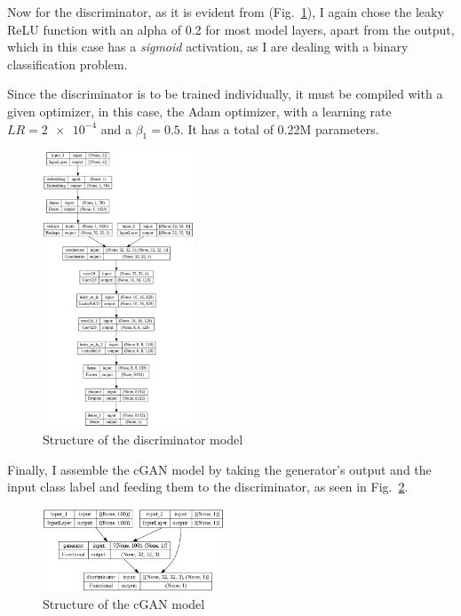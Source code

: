 \documentclass[conference]{IEEEtran}
\begin{document}
Now for the discriminator, as it is evident from (Fig.~\ref{fig:DiscStruct}), I again chose the leaky ReLU function with an alpha of 0.2 for most model layers, apart from the output, which in this case has a \textit{sigmoid} activation, as I are dealing with a binary classification problem.

Since the discriminator is to be trained individually, it must be compiled with a given optimizer, in this case, the Adam optimizer, with a learning rate $LR=\num{2e-4}$ and a $\beta_1=0.5$. It has a total of 0.22M parameters.

\begin{figure}[htbp]
    \centering
    \includegraphics[width=0.4\textwidth]{paper/images/summary/discriminator.png}
    \caption{Structure of the discriminator model}
    \label{fig:DiscStruct}
\end{figure}

Finally, I assemble the cGAN model by taking the generator's output and the input class label and feeding them to the discriminator, as seen in Fig.~\ref{fig:cGANStruct}.

\begin{figure}[htbp]
    \centering
    \includegraphics[width=0.48\textwidth]{paper/images/summary/cgan.png}
    \caption{Structure of the cGAN model}
    \label{fig:cGANStruct}
\end{figure}
\end{document}
